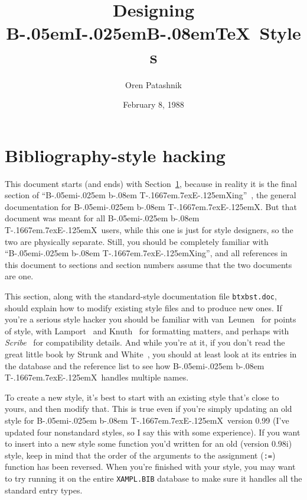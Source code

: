 
\def\BibTeX{{\rm B\kern-.05em{\sc i\kern-.025em b}\kern-.08em
    T\kern-.1667em\lower.7ex\hbox{E}\kern-.125emX}}

\title{Designing B\kern-.05em{\large I}\kern-.025em{\large B}\kern-.08em\TeX\
									Styles}
\author{Oren Patashnik}
\date{February 8, 1988}



\maketitle

\setcounter{section}{4}
\section{Bibliography-style hacking}
\label{style}

This document starts (and ends) with Section~\ref{style},
because in reality it is the final section of ``\BibTeX ing''~\cite{btxdoc},
the general documentation for \BibTeX.
But that document was meant for all \BibTeX\ users,
while this one is just for style designers,
so the two are physically separate.
Still, you should be completely familiar with ``\BibTeX ing''$\!$,
and all references in this document
to sections and section numbers
assume that the two documents are one.

This section,
along with the standard-style documentation file \hbox{\tt btxbst.doc},
should explain how to modify
existing style files and to produce new ones.
If you're a serious style hacker you should be familiar
with van~Leunen~\cite{van-leunen} for points of style,
with Lamport~\cite{latex} and Knuth~\cite{texbook} for formatting matters,
and perhaps with {\em Scribe\/}~\cite{scribe} for compatibility details.
And while you're at it, if you don't read the great little book by Strunk and
White~\cite{strunk-and-white}, you should at least look at its
entries in the database and the reference list
to see how \BibTeX\ handles multiple names.

To create a new style,
it's best to start with an existing style that's close to yours,
and then modify that.
This is true even if you're simply updating an old style
for \BibTeX\ version 0.99
(I've updated four nonstandard styles,
so I say this with some experience).
If you want to insert into a new style
some function you'd written for an old (version 0.98i) style,
keep in mind that the order of the arguments to
the assignment ({\tt :=}) function has been reversed.
When you're finished with your style,
you may want to try running it on the entire \hbox{\tt XAMPL.BIB} database
to make sure it handles all the standard entry types.

